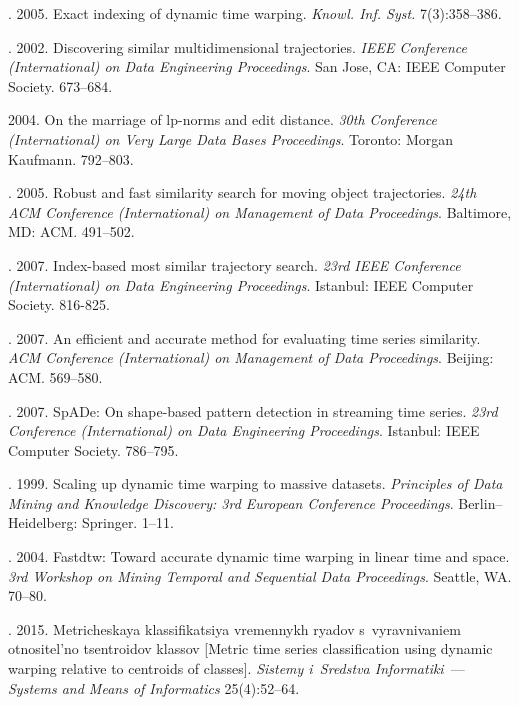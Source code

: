 \begin{multicols}{2}
{{\begin{thebibliography}{99}
. 2005. 
Exact indexing of dynamic time warping. \textit{Knowl. Inf. Syst.} 7(3):358--386.

. 2002. 
Discovering similar multidimensional trajectories. 
\textit{IEEE  Conference (International) on Data Engineering 
Proceedings}.  San Jose, CA: IEEE Computer Society. 673--684.

 2004. On the marriage of lp-norms and edit distance. 
\textit{30th Conference (International) on 
Very Large Data Bases Proceedings}. Toronto: Morgan Kaufmann. 792--803.

. 2005. 
Robust and fast similarity search for moving object trajectories. 
\textit{24th ACM  Conference (International) on Management of Data 
Proceedings}. Baltimore, MD: ACM. 491--502.

. 2007. 
Index-based most similar trajectory search. 
\textit{23rd IEEE Conference (International) on Data Engineering 
Proceedings}.  Istanbul: IEEE Computer Society. 816-825.

. 2007. An efficient and accurate method 
for evaluating time series similarity. 
\textit{ACM  Conference (International) on Management of Data 
Proceedings}. Beijing: ACM. 569--580.

. 2007. 
SpADe: On shape-based pattern detection in streaming time series. 
\textit{23rd  Conference (International) on Data Engineering 
Proceedings}. Istanbul: IEEE Computer Society. 786--795.

. 1999. 
Scaling up dynamic time warping to massive datasets. 
\textit{Principles of Data Mining and Knowledge Discovery: 
3rd European Conference Proceedings}. Berlin--Heidelberg: Springer. 1--11.


. 2004. Fastdtw: 
Toward accurate dynamic time warping in linear time and space. 
\textit{3rd Workshop on Mining Temporal and Sequential Data Proceedings}. 
Seattle, WA. 70--80.

. 2015. 
Metricheskaya klassifikatsiya vremennykh ryadov s~vyravnivaniem otnositel'no 
tsentroidov klassov [Metric time series classification using dynamic warping relative 
to centroids of classes]. \textit{Sistemy i~Sredstva Informatiki}~---
\textit{Systems and Means of Informatics} 25(4):52--64.


\end{thebibliography}}}
\end{multicols}
